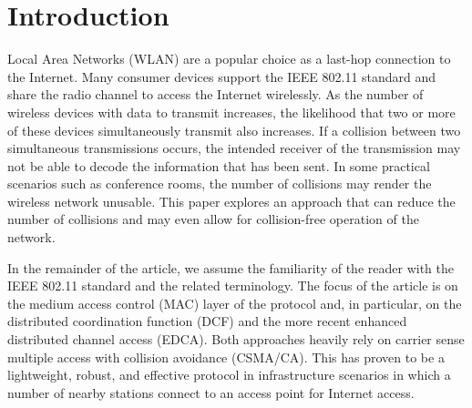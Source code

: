 \documentclass[journal]{IEEEtran}
\begin{document}
\section{Introduction}


 Local Area Networks (WLAN) are a popular choice as a last-hop connection to the Internet. Many consumer devices support the IEEE 802.11 standard \cite{IEEE80211-IEEESTD2007} and share the radio channel to access the Internet wirelessly. As the number of wireless devices with data to transmit increases, the likelihood that two or more of these devices simultaneously transmit also increases. If a collision between two simultaneous transmissions occurs, the intended receiver of the transmission may not be able to decode the information that has been sent. In some practical scenarios such as conference rooms, the number of collisions may render the wireless network unusable. This paper explores an approach that can reduce the number of collisions and may even allow for collision-free operation of the network.

In the remainder of the article, we assume the familiarity of the reader with the IEEE 802.11 standard and the related terminology. The focus of the article is on the medium access control (MAC) layer of the protocol and, in particular, on the distributed coordination function (DCF) and the more recent enhanced distributed channel access (EDCA). Both approaches heavily rely on carrier sense multiple access with collision avoidance (CSMA/CA). This has proven to be a lightweight, robust, and effective protocol in infrastructure scenarios in which a number of nearby stations connect to an access point for Internet access.
\end{document}
